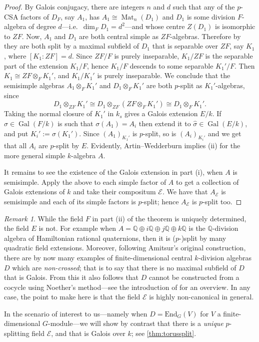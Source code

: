 \documentclass[11pt,reqno]{amsart}
\theoremstyle{definition}
\theoremstyle{remark}
\newtheorem{remark}[lemma]{Remark}
\theoremstyle{definition}
\theoremstyle{plain}
\DeclareMathOperator{\Gal}{Gal}
\DeclareMathOperator{\Mat}{Mat}
\newcommand{\End}{\mathrm{End}}
\newcommand{\Q}{\mathbb{Q}}
\begin{document}
\begin{proof}
  By Galois conjugacy, there are integers $n$ and $d$ such that any of the $p$-CSA factors of $D_F$, say $A_1$, has $A_1\cong \Mat_{n}(D_1)$ and $D_1$ is some division $F$-algebra of degree $d$---i.e.~$\dim_F D_1=d^2$---and whose centre $Z(D_1)$ is isomorphic to $ZF$.
  Now, $A_1$ and $D_1$ are both central simple as $ZF$-algebras. Therefore by \cite[15.12]{Lam1} they are both split by a maximal subfield of $D_1$ that is separable over $ZF$, say $K_1$, where $[K_1:ZF]=d$. 
  Since $ZF/F$ is purely inseparable, $K_1/ZF$ is the separable part of the extension $K_1/F$, hence $K_1/F$ descends to some separable $K_1'/F$.
  Then $K_1\cong ZF\otimes_F K_1'$, and $K_1/K_1'$ is purely inseparable.
  We conclude that the semisimple algebras $A_1\otimes_F K_1'$ and $D_1\otimes_F K_1'$ are both $p$-split as $K_1'$-algebras, since
  $$
  D_1\otimes_{ZF} K_1' \cong D_1\otimes_{ZF} (ZF\otimes_F K_1') \cong D_1\otimes_F K_1'.
  $$
  Taking the normal closure of $K_1'$ in $k_s$ gives a Galois extension $E/k$. If $\sigma\in \Gal(F/k)$ is such that $\sigma(A_1)=A_i$ then extend it to $\hat\sigma\in \Gal(E/k)$, and put $K_i':=\sigma(K_1')$. Since $(A_1)_{K_1'}$ is $p$-split, so is $(A_i)_{K_i'}$ and we get that all $A_i$ are $p$-split by $E$. Evidently, Artin--Wedderburn  implies (ii) for the more general simple $k$-algebra $A$.
  
  It remains to see the existence of the Galois extension in part (i), when $A$ is semisimple. Apply the above to each simple factor of $A$ to get a collection of Galois extensions of $k$ and take their compositum $\mathscr{E}$. We have that $A_\mathscr{E}$ is semisimple and each of its simple factors is $p$-split; hence $A_\mathscr{E}$ is $p$-split too.
\end{proof}

\begin{remark}\label{rem:noncan}While the field $F$ in part (ii) of the theorem is uniquely determined, the field $E$ is not. For example when $A=\Q\oplus i\Q\oplus j\Q\oplus k\Q$ is the $\mathbb{Q}$-division algebra of Hamiltonian rational quaternions, then it is ($p$-)split by many quadratic field extensions. Moreover,  following Amitsur's original construction, there are by now many examples of finite-dimensional central $k$-division algebras $D$ which are \emph{non-crossed}; that is to say that there is no maximal subfield of $D$ that is Galois. From this it also follows that $D$ cannot be constructed from a cocycle using Noether's method---see the introduction of \cite{Han04} for an overview. In any case, the point to make here is that the field $\mathscr{E}$ is highly non-canonical in general.

  In the scenario of interest to us---namely when $D=\End_G(V)$ for $V$ a finite-dimensional $G$-module---we will show by contrast that there is a \emph{unique} $p$-splitting field $\mathscr{E}$, and that is Galois over $k$; see \cref{thm:torussplit}.
\end{remark}
\end{document}
